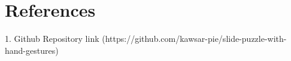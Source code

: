 \appendix
\chapter{References}
1. Github Repository link (https://github.com/kawsar-pie/slide-puzzle-with-hand-gestures)
